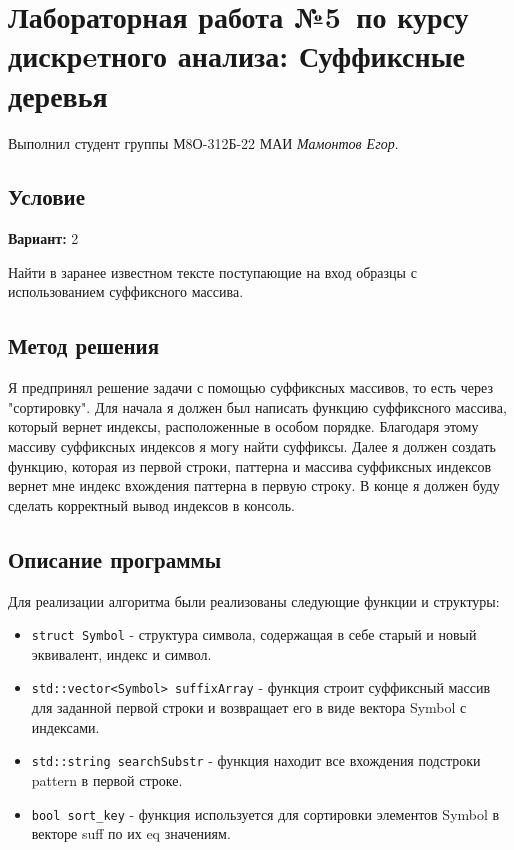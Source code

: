 \documentclass[12pt]{article}
\begin{document}
\section*{Лабораторная работа №5\, по курсу дискрeтного анализа: Суффиксные деревья}

Выполнил студент группы М8О-312Б-22 МАИ \textit{Мамонтов Егор}.

\subsection*{Условие}

\textbf{Вариант:} 2

Найти в заранее известном тексте поступающие на вход образцы с использованием суффиксного массива.

\newpage
\subsection*{Метод решения}

Я предпринял решение задачи с помощью суффиксных массивов, то есть через "сортировку". 
Для начала я должен был написать функцию суффиксного массива, который вернет индексы, расположенные в особом порядке. Благодаря этому массиву суффиксных индексов я могу найти суффиксы.
Далее я должен создать функцию, которая из первой строки, паттерна и массива суффиксных индексов вернет мне индекс вхождения паттерна в первую строку. В конце я должен буду сделать корректный вывод индексов в консоль.
\subsection*{Описание программы}

Для реализации алгоритма были реализованы следующие функции и структуры:
\begin{itemize}
    \item \texttt{struct Symbol} - структура символа, содержащая в себе старый и новый эквивалент, индекс и символ.
    \item \texttt{std::vector<Symbol> suffixArray} - функция строит суффиксный массив для заданной первой строки и возвращает его в виде вектора Symbol с индексами.
    \item \texttt{std::string searchSubstr} - функция находит все вхождения подстроки pattern в первой строке.
    \item \texttt{bool sort\_key} - функция используется для сортировки элементов Symbol в векторе suff по их eq значениям.
\end{itemize}
\end{document}
